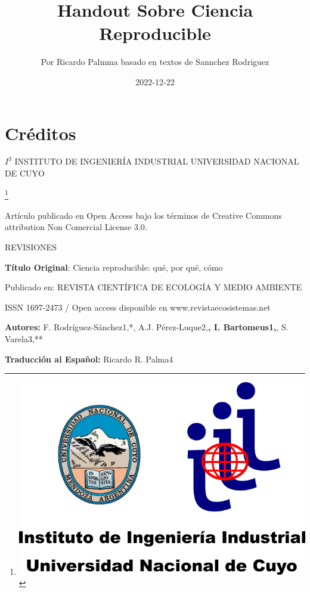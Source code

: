 \documentclass[]{tufte-handout}
\title[Ciencia abierta y reputación cientifica]{Handout Sobre Ciencia
Reproducible}
\author{Por Ricardo Palmma basado en textos de Sannchez Rodriguez}
\date{2022-12-22}
\begin{document}
\maketitle




\hypertarget{cruxe9ditos}{%
\section{Créditos}\label{cruxe9ditos}}

\(I^3\) INSTITUTO DE INGENIERÍA INDUSTRIAL UNIVERSIDAD NACIONAL DE CUYO

\footnote{\includegraphics{images/iii.png}}

Artículo publicado en Open Access bajo los términos de Creative Commons
attribution Non Comercial License 3.0.

REVISIONES

\textbf{Título Original}: Ciencia reproducible: qué, por qué, cómo

Publicado en: REVISTA CIENTÍFICA DE ECOLOGÍA Y MEDIO AMBIENTE

ISSN 1697-2473 / Open access disponible en www.revistaecosistemas.net

\textbf{Autores:} F. Rodríguez-Sánchez1,*, A.J. Pérez-Luque2,\textbf{,
I. Bartomeus1,}, S. Varela3,**

\textbf{Traducción al Español: } Ricardo R. Palma4
\end{document}
